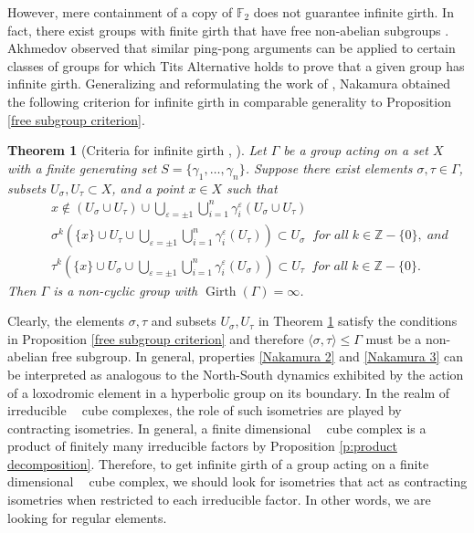 \documentclass{amsart}
\newtheorem{theorem}{Theorem}%
\theoremstyle{definition}
\newtheorem*{Notation warning}{Warning on notations}
\newtheorem*{Sketch of proof}{Sketch of proof for Theorem C}
\DeclareMathOperator{\cat}{CAT(0)}
\DeclareMathOperator{\Gir}{Girth}
\begin{document}
\begin{sloppypar}
However, mere containment of a copy of $\mathbb{F}_2$ does not guarantee infinite girth.
In fact, there exist groups with finite girth that have free non-abelian subgroups \cite{AKHMEDOV2003198}.
Akhmedov \cite{akhmedov2005girth} observed that similar ping-pong arguments can be applied to certain classes of groups for which Tits Alternative holds to prove that a given group has infinite girth. 
Generalizing and reformulating the work of \cite{akhmedov2005girth}, Nakamura obtained the following criterion for infinite girth in comparable generality to Proposition \ref{free subgroup criterion}.

\begin{theorem}[Criteria for infinite girth \cite{nakamura2011girth}, \cite{nakamura2008some}]\label{t:criteria for infinite girth}
    Let $\Gamma$ be a group acting on a set $X$ with a finite generating set $S=\{\gamma_1,\ldots,\gamma_n\}$. Suppose there exist elements $\sigma,\tau\in \Gamma$, subsets $U_\sigma,U_\tau\subset X$, and a point $x\in X$ such that
    \begin{align}
       \label{Nakamura 1}&\;\;\;\; x\notin(U_\sigma\cup U_\tau)\cup\bigcup_{\varepsilon=\pm1}\bigcup_{i=1}^n\gamma_i^\varepsilon(U_\sigma\cup U_\tau)
       \\
       \label{Nakamura 2}&\;\;\;\;\sigma^k\left(\{x\}\cup U_\tau\cup\bigcup_{\varepsilon=\pm1}\bigcup_{i=1}^n\gamma_i^\varepsilon(U_\tau) \right)\subset U_\sigma\;\;for\;all\;k\in\mathbb{Z}-\{0\},\;and
       \\
       \label{Nakamura 3}&\;\;\;\;\tau^k\left(\{x\}\cup U_\sigma\cup\bigcup_{\varepsilon=\pm1}\bigcup_{i=1}^n\gamma_i^\varepsilon(U_\sigma)\right)\subset U_\tau\;\;for\;all\;k\in\mathbb{Z}-\{0\}.
    \end{align}
    Then $\Gamma$ is a non-cyclic group with $\Gir(\Gamma)=\infty$.
\end{theorem}

Clearly, the elements $\sigma,\tau$ and subsets $U_\sigma,U_\tau$ in Theorem \ref{t:criteria for infinite girth} satisfy the conditions in Proposition \ref{free subgroup criterion} and therefore $\langle\sigma,\tau\rangle\le\Gamma$ must be a non-abelian free subgroup.
In general, properties \eqref{Nakamura 2} and \eqref{Nakamura 3} can be interpreted as analogous to the North-South dynamics exhibited by the action of a loxodromic element in a hyperbolic group on its boundary.
In the realm of irreducible $\cat$ cube complexes, the role of such isometries are played by contracting isometries. 
In general, a finite dimensional $\cat$ cube complex is a product of finitely many irreducible factors by Proposition \ref{p:product decomposition}.
Therefore, to get infinite girth of a group acting on a finite dimensional $\cat$ cube complex, we should look for isometries that act as contracting isometries when restricted to each irreducible factor. In other words, we are looking for regular elements.
\medskip


\end{sloppypar}
\end{document}
